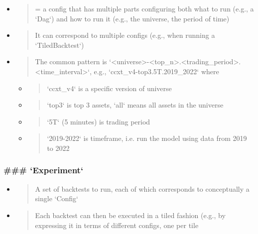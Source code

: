 \documentclass[11pt, reqno]{amsart}
\begin{document}
\begin{itemize}
\item
  \begin{quote}
  = a config that has multiple parts configuring both what to run (e.g.,
  a `Dag`) and how to run it (e.g., the universe, the period of time)
  \end{quote}
\item
  \begin{quote}
  It can correspond to multiple configs (e.g., when running a
  `TiledBacktest`)
  \end{quote}
\item
  \begin{quote}
  The common pattern is
  `\textless universe\textgreater-\textless top\_n\textgreater.\textless trading\_period\textgreater.\textless time\_interval\textgreater`,
  e.g., `ccxt\_v4-top3.5T.2019\_2022` where
  \end{quote}

  \begin{itemize}
  \item
    \begin{quote}
    `ccxt\_v4` is a specific version of universe
    \end{quote}
  \item
    \begin{quote}
    `top3` is top 3 assets, `all` means all assets in the universe
    \end{quote}
  \item
    \begin{quote}
    `5T` (5 minutes) is trading period
    \end{quote}
  \item
    \begin{quote}
    `2019-2022` is timeframe, i.e. run the model using data from 2019 to
    2022
    \end{quote}
  \end{itemize}
\end{itemize}

\hypertarget{experiment}{%
\subsubsection{\texorpdfstring{\textbf{\#\#\#
`Experiment`}}{\#\#\# `Experiment`}}\label{experiment}}

\begin{itemize}
\item
  \begin{quote}
  A set of backtests to run, each of which corresponds to conceptually a
  single `Config`
  \end{quote}
\item
  \begin{quote}
  Each backtest can then be executed in a tiled fashion (e.g., by
  expressing it in terms of different configs, one per tile
  \end{quote}
\end{itemize}
\end{document}
